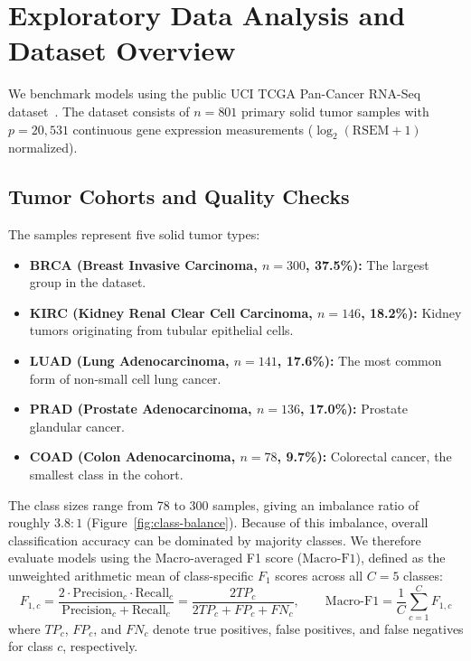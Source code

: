 \documentclass[11pt,a4paper]{article}
\begin{document}
\section{Exploratory Data Analysis and Dataset Overview}

We benchmark models using the public UCI TCGA Pan-Cancer RNA-Seq dataset~\cite{fiorini2016gene,weinstein2013cancer}. The dataset consists of $n = 801$ primary solid tumor samples with $p = 20{,}531$ continuous gene expression measurements ($\log_2(\text{RSEM} + 1)$ normalized).

\subsection{Tumor Cohorts and Quality Checks}
The samples represent five solid tumor types:
\begin{itemize}
    \item \textbf{BRCA (Breast Invasive Carcinoma, $n = 300$, 37.5\%):} The largest group in the dataset.
    \item \textbf{KIRC (Kidney Renal Clear Cell Carcinoma, $n = 146$, 18.2\%):} Kidney tumors originating from tubular epithelial cells.
    \item \textbf{LUAD (Lung Adenocarcinoma, $n = 141$, 17.6\%):} The most common form of non-small cell lung cancer.
    \item \textbf{PRAD (Prostate Adenocarcinoma, $n = 136$, 17.0\%):} Prostate glandular cancer.
    \item \textbf{COAD (Colon Adenocarcinoma, $n = 78$, 9.7\%):} Colorectal cancer, the smallest class in the cohort.
\end{itemize}

The class sizes range from 78 to 300 samples, giving an imbalance ratio of roughly $3.8:1$ (Figure~\ref{fig:class-balance}). Because of this imbalance, overall classification accuracy can be dominated by majority classes. We therefore evaluate models using the Macro-averaged F1 score ($\text{Macro-F1}$), defined as the unweighted arithmetic mean of class-specific $F_1$ scores across all $C = 5$ classes:
\begin{equation}
    F_{1, c} = \frac{2 \cdot \text{Precision}_c \cdot \text{Recall}_c}{\text{Precision}_c + \text{Recall}_c} = \frac{2 TP_c}{2 TP_c + FP_c + FN_c}, \qquad \text{Macro-F1} = \frac{1}{C} \sum_{c=1}^C F_{1, c}
\end{equation}
where $TP_c$, $FP_c$, and $FN_c$ denote true positives, false positives, and false negatives for class $c$, respectively.
\end{document}
